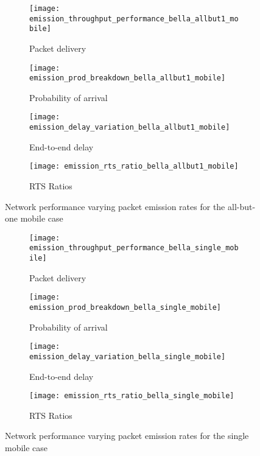 \begin{figure}[tp!]
  \begin{subfigure}[t]{0.5\textwidth}
    \centering
    \texttt{[image: emission\_throughput\_performance\_bella\_allbut1\_mobile]}
    \caption{Packet delivery}
    \label{fig:emission_throughput_performance_bella_allbut1_mobile}
  \end{subfigure}
  \begin{subfigure}[t]{0.5\textwidth}
    \centering
    \texttt{[image: emission\_prod\_breakdown\_bella\_allbut1\_mobile]}
    \caption{Probability of arrival}
    \label{fig:emission_prod_breakdown_bella_allbut1_mobile}
  \end{subfigure}

  \begin{subfigure}[t]{0.5\textwidth}
    \centering
    \texttt{[image: emission\_delay\_variation\_bella\_allbut1\_mobile]}
    \caption{End-to-end delay}
    \label{fig:emission_delay_variation_bella_allbut1_mobile}
  \end{subfigure}
  \begin{subfigure}[t]{0.5\textwidth}
    \centering
    \texttt{[image: emission\_rts\_ratio\_bella\_allbut1\_mobile]}
    \caption{RTS Ratios}
    \label{fig:emission_rts_ratio_bella_allbut1_mobile}
  \end{subfigure}
  \caption{Network performance varying packet emission rates for the all-but-one mobile case}
  \label{fig:emission_bella_allbut1_mobile}
\end{figure}

\begin{figure}[bp!]
  \begin{subfigure}[t]{0.5\textwidth}
    \centering
    \texttt{[image: emission\_throughput\_performance\_bella\_single\_mobile]}
    \caption{Packet delivery}
    \label{fig:emission_throughput_performance_bella_single_mobile}
  \end{subfigure}
  \begin{subfigure}[t]{0.5\textwidth}
    \centering
    \texttt{[image: emission\_prod\_breakdown\_bella\_single\_mobile]}
    \caption{Probability of arrival}
    \label{fig:emission_prod_breakdown_bella_single_mobile}
  \end{subfigure}

  \begin{subfigure}[t]{0.5\textwidth}
    \centering
    \texttt{[image: emission\_delay\_variation\_bella\_single\_mobile]}
    \caption{End-to-end delay}
    \label{fig:emission_delay_variation_bella_single_mobile}
  \end{subfigure}
  \begin{subfigure}[t]{0.5\textwidth}
    \centering
    \texttt{[image: emission\_rts\_ratio\_bella\_single\_mobile]}
    \caption{RTS Ratios}
    \label{fig:emission_rts_ratio_bella_single_mobile}
  \end{subfigure}
  \caption{Network performance varying packet emission rates for the single mobile case}
  \label{fig:emission_bella_single_mobile}
\end{figure}


